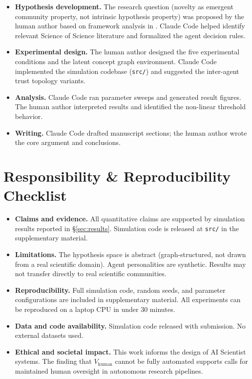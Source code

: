 \documentclass[11pt]{article}
\begin{document}
\begin{itemize}
  \item \textbf{Hypothesis development.} The research question (novelty as emergent community
  property, not intrinsic hypothesis property) was proposed by the human author based on
  framework analysis in \citet{shin2026sciagent}. Claude Code helped identify relevant
  Science of Science literature and formalized the agent decision rules.

  \item \textbf{Experimental design.} The human author designed the five experimental
  conditions and the latent concept graph environment. Claude Code implemented the simulation
  codebase (\texttt{src/}) and suggested the inter-agent trust topology variants.

  \item \textbf{Analysis.} Claude Code ran parameter sweeps and generated result figures.
  The human author interpreted results and identified the non-linear threshold behavior.

  \item \textbf{Writing.} Claude Code drafted manuscript sections; the human author wrote
  the core argument and conclusions.
\end{itemize}

\newpage
\section*{Responsibility \& Reproducibility Checklist}

\begin{itemize}
  \item \textbf{Claims and evidence.} All quantitative claims are supported by simulation
  results reported in \S\ref{sec:results}. Simulation code is released at
  \texttt{src/} in the supplementary material.

  \item \textbf{Limitations.} The hypothesis space is abstract (graph-structured, not
  drawn from a real scientific domain). Agent personalities are synthetic. Results may
  not transfer directly to real scientific communities.

  \item \textbf{Reproducibility.} Full simulation code, random seeds, and parameter
  configurations are included in supplementary material. All experiments can be
  reproduced on a laptop CPU in under 30 minutes.

  \item \textbf{Data and code availability.} Simulation code released with submission.
  No external datasets used.

  \item \textbf{Ethical and societal impact.} This work informs the design of AI Scientist
  systems. The finding that $V_\text{human}$ cannot be fully automated supports calls for
  maintained human oversight in autonomous research pipelines.
\end{itemize}
\end{document}
